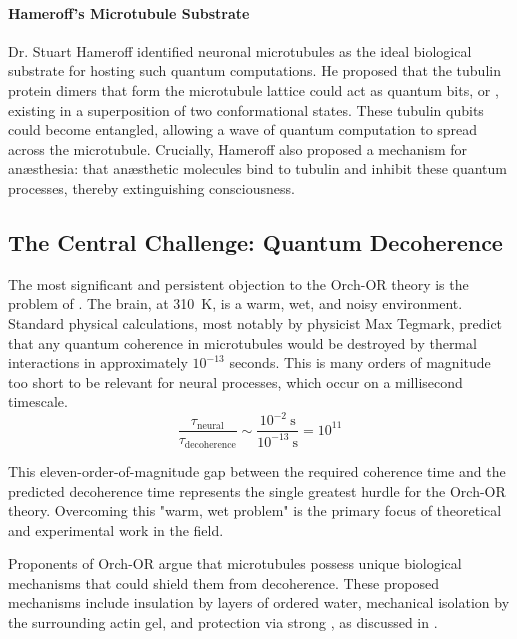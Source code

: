 \paragraph{Hameroff's Microtubule Substrate}
Dr. Stuart Hameroff identified neuronal microtubules as the ideal biological substrate for hosting such quantum computations. He proposed that the tubulin protein dimers that form the microtubule lattice could act as quantum bits, or , existing in a superposition of two conformational states. These tubulin qubits could become entangled, allowing a wave of quantum computation to spread across the microtubule. Crucially, Hameroff also proposed a mechanism for anæsthesia: that anæsthetic molecules bind to tubulin and inhibit these quantum processes, thereby extinguishing consciousness.

\subsection{The Central Challenge: Quantum Decoherence}

The most significant and persistent objection to the Orch-OR theory is the problem of . The brain, at 310~K, is a warm, wet, and noisy environment. Standard physical calculations, most notably by physicist Max Tegmark, predict that any quantum coherence in microtubules would be destroyed by thermal interactions in approximately \(10^{-13}\) seconds. This is many orders of magnitude too short to be relevant for neural processes, which occur on a millisecond timescale.
\begin{equation}
\label{eq:coherence-gap}
\frac{\tau_{\text{neural}}}{\tau_{\text{decoherence}}} \sim \frac{10^{-2}~\text{s}}{10^{-13}~\text{s}} = 10^{11}
\end{equation}

\begin{warningbox}
    This eleven-order-of-magnitude gap between the required coherence time and the predicted decoherence time represents the single greatest hurdle for the Orch-OR theory. Overcoming this "warm, wet problem" is the primary focus of theoretical and experimental work in the field.
\end{warningbox}

Proponents of Orch-OR argue that microtubules possess unique biological mechanisms that could shield them from decoherence. These proposed mechanisms include insulation by layers of ordered water, mechanical isolation by the surrounding actin gel, and protection via strong , as discussed in .

